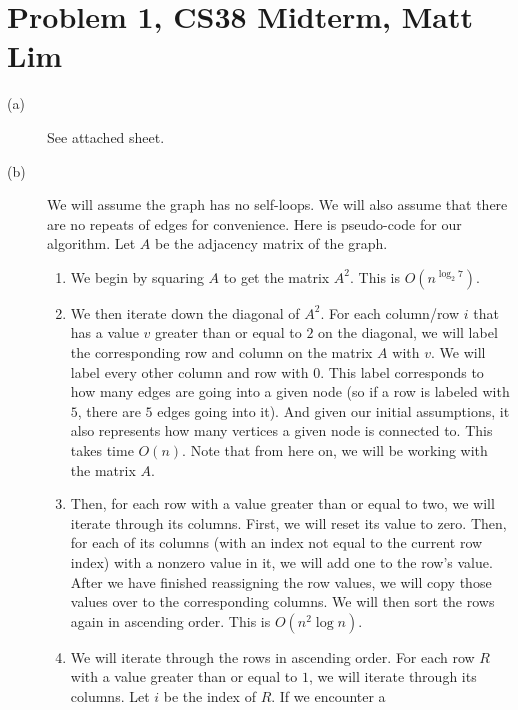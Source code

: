 \documentclass{article}
\begin{document}
\section*{Problem 1, CS38 Midterm, Matt Lim}
\begin{description}
    \item[(a)]
        See attached sheet.
    \item[(b)]
        We will assume the graph has no self-loops. We will also assume that
        there are no repeats of edges for convenience.
        Here is pseudo-code for our algorithm. Let $A$ be the adjacency matrix
        of the graph.
        \begin{enumerate}
            \item
                We begin by squaring $A$ to get the matrix $A^2$. This is
                $O(n^{\log _2 7})$.
            \item
                We then iterate down the diagonal of $A^2$. For each column/row
                $i$ that has a value $v$ greater than or equal to $2$ on the
                diagonal, we will label the corresponding row and column on the
                matrix $A$ with $v$. We will label every other column and row
                with $0$. This label corresponds to how many edges are going
                into a given node (so if a row is labeled with $5$,  there are
                $5$ edges going into it). And given our initial assumptions, it
                also represents how many vertices a given node is connected to.
                This takes time $O(n)$. Note that from here on, we
                will be working with the matrix $A$.
            \item Then, for each row with a value greater than or equal to two, we will iterate
                through its columns. First, we will reset its value to zero.
                Then, for each of its columns (with an index not equal to
                the current row index) with a nonzero value in it, we will
                add one to the row's value. After we have finished reassigning
                the row values, we will copy those values over to the
                corresponding columns. We will then sort the rows
                again in ascending order. This is $O(n^2\log n)$.
            \item
                We will iterate through the rows in ascending order. For each
                row $R$ with a value greater than or equal to $1$, we will iterate
                through its columns. Let $i$ be the index of $R$. If we encounter a

\end{enumerate}
\end{description}
\end{document}
